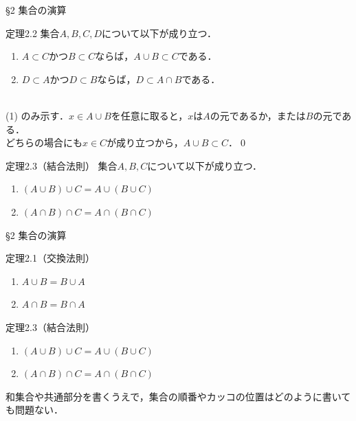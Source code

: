 \documentclass[uplatex,a4paper,dvipdfmx,aspectratio=169,11pt]{beamer}
\begin{document}
\begin{frame}[fragile]{\S 2 集合の演算}
    \begin{block}{定理2.2}
        集合$A, B, C, D$について以下が成り立つ．
        \begin{enumerate}[(1)]
            \item $A \subset C$かつ$B \subset C$ならば，$A \cup B \subset C$である．
            \item $D \subset A$かつ$D \subset B$ならば，$D \subset A \cap B$である．
        \end{enumerate}
    \end{block}
    \medskip
     \\
    \medskip
    (1) のみ示す．$x \in A \cup B$を任意に取ると，$x$は$A$の元であるか，または$B$の元である．\\
    どちらの場合にも$x \in C$が成り立つから，$A \cup B \subset C$．\qed

    \begin{block}{定理2.3（結合法則）}
        集合$A, B, C$について以下が成り立つ．
        \begin{enumerate}[(1)]
            \item $(A \cup B) \cup C = A \cup (B \cup C)$
            \item $(A \cap B) \cap C = A \cap (B \cap C)$
        \end{enumerate}
    \end{block}
\end{frame}

\begin{frame}[fragile]{\S 2 集合の演算}
    \begin{block}{定理2.1（交換法則）}
        \begin{enumerate}[(3)]
            \item[(3)] $A \cup B = B \cup A$
            \item[(6)] $A \cap B = B \cap A$
        \end{enumerate}
    \end{block}
    \begin{block}{定理2.3（結合法則）}
        \begin{enumerate}[(1)]
            \item $(A \cup B) \cup C = A \cup (B \cup C)$
            \item $(A \cap B) \cap C = A \cap (B \cap C)$
        \end{enumerate}
    \end{block}
    \smallskip

    和集合や共通部分を書くうえで，集合の順番やカッコの位置はどのように書いても問題ない．
\end{frame}
\end{document}
